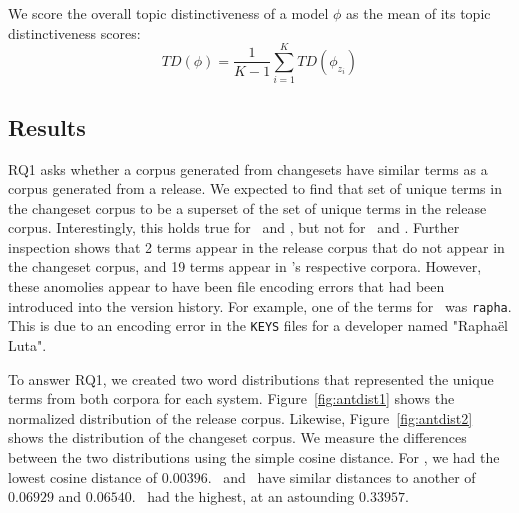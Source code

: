 We score the overall topic distinctiveness of a model $\phi$ as the mean of
its topic distinctiveness scores:
\begin{equation}
TD(\phi) =
\frac{1}{K - 1}
\sum_{i=1}^{K}
TD(\phi_{z_i})
\label{eq:overalltopicdistinctiveness}
\end{equation}



\subsection{Results}

RQ1 asks whether a corpus generated from changesets have similar terms
as a corpus generated from a release.
We expected to find that set of unique terms in the changeset corpus to be
a superset of the set of unique terms in the release corpus.
Interestingly, this holds true for \jodatime\ and \aspectj,
but not for \ant\ and \postgres.
Further inspection shows that 2 terms appear in the \ant release corpus that do not appear in the changeset corpus,
and 19 terms appear in \postgres's respective corpora.
However, these anomolies appear to have been file encoding errors that
had been introduced into the version history.
For example, one of the terms for \ant\ was \texttt{rapha}. This is due
to an encoding error in the \texttt{KEYS} files for a developer named
"Rapha\"{e}l Luta".

To answer RQ1, we created two word distributions that represented the unique
terms from both corpora for each system.
Figure~\ref{fig:antdist1} shows the normalized distribution of the \ant release corpus.
Likewise, Figure~\ref{fig:antdist2} shows the distribution of the \ant changeset corpus.
We measure the differences between the two distributions using the simple
cosine distance. For \ant, we had the lowest cosine distance of $0.00396$.
\aspectj\ and \jodatime\ have similar distances to another of $0.06929$ and
$0.06540$. \postgres\ had the highest, at an astounding $0.33957$.

%
%

